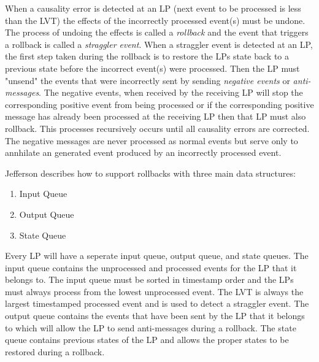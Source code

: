 \documentclass[11pt]{book}
\begin{document}
When a causality error is detected at an LP (next event to be processed is less than the
LVT) the effects of the incorrectly processed event(s) must be undone.  The process
of undoing the effects is called a \emph{rollback} and the event that triggers a rollback
is called a \emph{straggler event}.  When a straggler event is detected at an LP, the first
step taken during the rollback is to restore the LPs state back to a previous state before
the incorrect event(s) were processed.  Then the LP must "unsend" the events that were
incorrectly sent by sending \emph{negative events} or \emph{anti-messages}.  The negative
events, when received by the receiving LP will stop the corresponding positive event from
being processed or if the corresponding positive message has already been processed at
the receiving LP then that LP must also rollback.  This processes recursively occurs until
all causality errors are corrected.  The negative messages are never processed as normal
events but serve only to annhilate an generated event produced by an incorrectly processed
event.

Jefferson\cite{jefferson-85} describes how to support rollbacks with three main data structures:

\begin{enumerate}
    \item Input Queue
    \item Output Queue
    \item State Queue
\end{enumerate}

\noindent
Every LP will have a seperate input queue, output queue, and state queues.  The input
queue contains the unprocessed and processed events for the LP that it belongs to.  The
input queue must be sorted in timestamp order and the LPs must always process from the
lowest unprocessed event.  The LVT is always the largest timestamped processed event and
is used to detect a straggler event.  The output queue contains the events that have been
sent by the LP that it belongs to which will allow the LP to send anti-messages during a
rollback.  The state queue contains previous states of the LP and allows the proper states
to be restored during a rollback.
\end{document}
